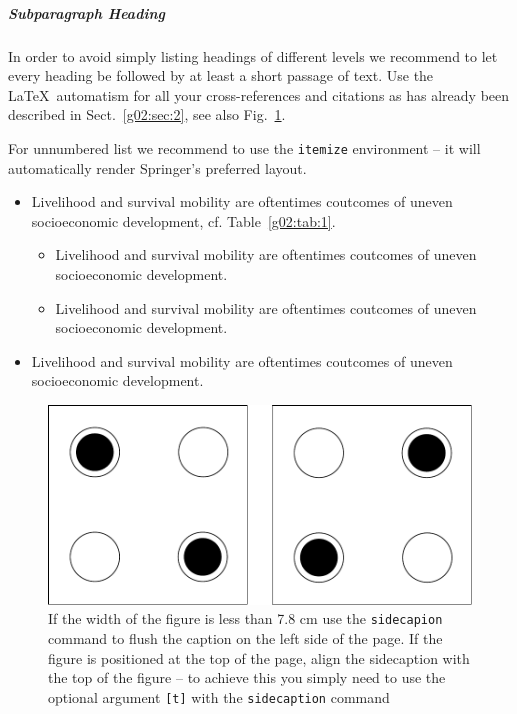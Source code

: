 \subparagraph{Subparagraph Heading} In order to avoid simply listing headings of different levels we recommend to let every heading be followed by at least a short passage of text. Use the \LaTeX\ automatism for all your cross-references and citations as has already been described in Sect.~\ref{g02:sec:2}, see also Fig.~\ref{g02:fig:2}.

For unnumbered list we recommend to use the \verb|itemize| environment -- it will automatically render Springer's preferred layout.

\begin{itemize}
\item{Livelihood and survival mobility are oftentimes coutcomes of uneven socioeconomic development, cf. Table~\ref{g02:tab:1}.}
\begin{itemize}
\item{Livelihood and survival mobility are oftentimes coutcomes of uneven socioeconomic development.}
\item{Livelihood and survival mobility are oftentimes coutcomes of uneven socioeconomic development.}
\end{itemize}
\item{Livelihood and survival mobility are oftentimes coutcomes of uneven socioeconomic development.}
\end{itemize}

\begin{figure}[t]
\sidecaption[t]
\includegraphics[scale=.3]{qca_cells}
%
%
\caption{If the width of the figure is less than 7.8 cm use the \texttt{sidecapion} command to flush the caption on the left side of the page. If the figure is positioned at the top of the page, align the sidecaption with the top of the figure -- to achieve this you simply need to use the optional argument \texttt{[t]} with the \texttt{sidecaption} command}
\label{g02:fig:2}       %
\end{figure}

